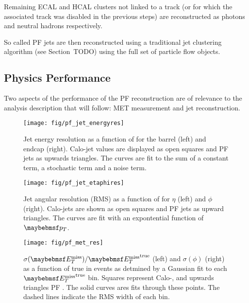 Remaining \ac{ECAL} and \ac{HCAL} clusters not linked to a track (or for which
the associated track was disabled in the previous steps) are reconstructed as
photons and neutral hadrons respectively.

So called \ac{PF} jets are then reconstructed using a traditional jet clustering
algorithm (see Section~TODO) using the full set of particle flow objects.

\subsection{Physics Performance}
Two aspects of the performance of the \ac{PF} reconstruction are of relevance to
the analysis description that will follow: \acl{MET} measurement and jet
reconstruction.

\begin{figure}
\texttt{[image: fig/pf\_jet\_energyres]}
\caption{Jet energy resolution as a function of \Pt for the barrel (left) and
  endcap (right). Calo-jet values are displayed as open squares and \ac{PF} jets
  as upwards triangles. The curves are fit to the sum of a constant term, a
  stochastic term and a noise term.}
\label{fig:pf_jet_energyres}
\end{figure}

\begin{figure}
\texttt{[image: fig/pf\_jet\_etaphires]}
\caption{Jet angular resolution (\ac{RMS}) as a function of \Pt for $\eta$
  (left) and $\phi$ (right). Calo-jets are shown as open squares and \ac{PF}
  jets as upward triangles. The curves are fit with an expontential function of
  $\Pt$.}
\label{fig:pf_jet_etaphires}
\end{figure}

\begin{figure}
\texttt{[image: fig/pf\_met\_res]}
\caption{$\sigma(\MET)/\MET^{\textrm{true}}$ (left) and $\sigma(\phi)$ (right)
  as a function of true \MET in \ttbar events as detmined by a Gaussian fit to
  each $\MET^{\textrm{true}}$ bin. Squares represent Calo-\MET, and upwards
  triangles \ac{PF} \MET. The solid curves ares fits through these points. The
  dashed lines indicate the \ac{RMS} width of each bin.}
\label{fig:pf_met_res}
\end{figure}
